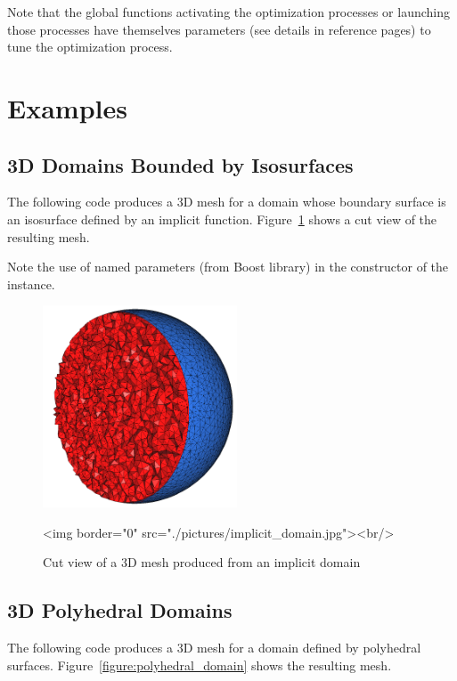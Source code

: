 Note that the global functions activating the optimization processes or launching
those processes have themselves parameters (see details in reference pages) to tune the optimization process.

\section{Examples}
\label{Mesh_3_section_examples}


\subsection{3D Domains Bounded by Isosurfaces}
The following code produces a 3D mesh for a domain whose boundary surface
is an  isosurface   defined by an implicit
function. Figure~\ref{figure:implicit_domain} shows a cut view of the
resulting mesh.

Note the use of named parameters (from Boost library) in the
constructor of the  instance.


\begin{figure}[ht]
\begin{center}
 \begin{ccTexOnly}
   \includegraphics[height=6cm]{Mesh_3/pictures/implicit_domain}
 \end{ccTexOnly}
 \begin{ccHtmlOnly}
   <img border="0" src="./pictures/implicit_domain.jpg"><br/>
 \end{ccHtmlOnly}
 \caption{Cut view of a 3D mesh produced from an implicit domain}
  \label{figure:implicit_domain}
\end{center}
\end{figure}


\subsection{3D Polyhedral Domains}
\label{Mesh_3_subsection_examples_polyhedral}
The following code produces a 3D mesh for a domain
defined by polyhedral surfaces. Figure~\ref{figure:polyhedral_domain}
shows the resulting mesh.

